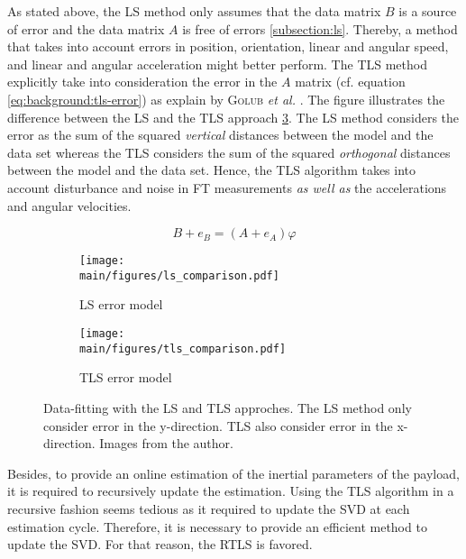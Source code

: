 \documentclass[/home/francois/latex/report/main.tex]{subfiles}
\begin{document}
As stated above, the \ac{LS} method only assumes that the data matrix $B$ is a source of error and the data matrix $A$ is free of errors \ref{subsection:ls}. Thereby, a method that takes into account errors in position, orientation, linear and angular speed, and linear and angular acceleration might better perform. The \ac{TLS} method explicitly take into consideration the error in the $A$ matrix (cf. equation \ref{eq:background:tls-error}) as explain by \textsc{Golub} \textit{et al.} \cite{Golub1980}. The figure illustrates the difference between the \ac{LS} and the \ac{TLS} approach \ref{fig:background:ls-tls-error}. The \ac{LS} method considers the error as the sum of the squared \textit{vertical} distances between the model and the data set whereas the \ac{TLS} considers the sum of the squared \textit{orthogonal} distances between the model and the data set. Hence, the \ac{TLS} algorithm takes into account disturbance and noise in \ac{FT} measurements \textit{as well as} the accelerations and angular velocities.

\begin{equation}
  \label{eq:background:tls-error}
B + e_B = (A + e_A) \varphi
\end{equation}

\begin{figure}[H]
\centering
\begin{subfigure}{0.49\textwidth}
\centering
\texttt{[image: \\main/figures/ls\_comparison.pdf]}
\caption{\ac{LS} error model}
\label{fig:background:ls-error}
\end{subfigure}
\begin{subfigure}{0.49\textwidth}
\centering
\texttt{[image: \\main/figures/tls\_comparison.pdf]}
\caption{\ac{TLS} error model}
\label{fig:background:tls-error}
\end{subfigure}
\caption{Data-fitting with the \ac{LS} and \ac{TLS} approches. The \ac{LS} method only consider error in the y-direction. \ac{TLS} also consider error in the x-direction. Images from the author.}
\label{fig:background:ls-tls-error}
\end{figure}

Besides, to provide an online estimation of the inertial parameters of the payload, it is required to recursively update the estimation. Using the \ac{TLS} algorithm in a recursive fashion seems tedious as it required to update the \ac{SVD} at each estimation cycle. Therefore, it is necessary to provide an efficient method to update the \ac{SVD}. For that reason, the \ac{RTLS} is favored.
\end{document}
